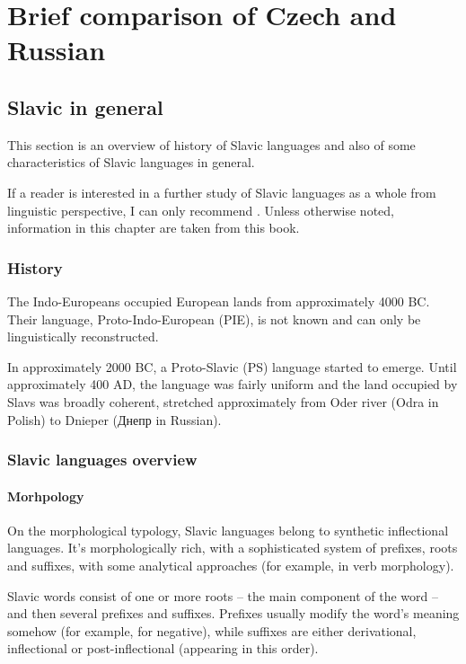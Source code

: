 \chapter{Brief comparison of Czech and Russian}

\section{Slavic in general}
This section is an overview of history of Slavic languages and also of some characteristics of Slavic languages in general.


If a reader is interested in a further study of Slavic languages as a whole from linguistic perspective, I can only recommend \cite{sussex2011slavic}.
Unless otherwise noted, information in this chapter are taken from this book.\subsection{History}

\label{ch:common_history}

The Indo-Europeans occupied European lands from approximately 4000 BC. Their language, Proto-Indo-European (PIE), is not known and can only be linguistically reconstructed. 

In approximately 2000 BC, a Proto-Slavic (PS) language started to emerge. Until approximately 400 AD, the language was fairly uniform and the land occupied by Slavs was broadly coherent, stretched approximately from Oder river (Odra in Polish) to Dnieper (Днепр in Russian).

\subsection{Slavic languages overview}
\subsubsection{Morhpology}
On the morphological typology, Slavic languages belong to synthetic inflectional languages. It's morphologically rich, with a sophisticated system of prefixes, roots and suffixes, with some analytical approaches (for example, in verb morphology).

Slavic words consist of one or more roots -- the main component of the word -- and then several prefixes and suffixes. Prefixes usually modify the word's meaning somehow (for example,  for negative), while suffixes are either derivational, inflectional or post-inflectional (appearing in this order).

